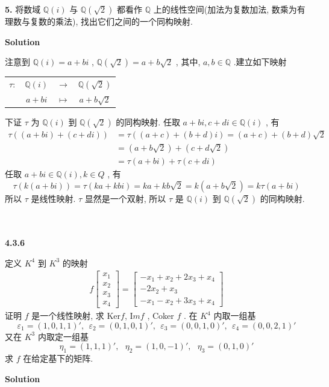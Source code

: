 \documentclass[11pt,a4paper,openany,oneside]{book}
\newcommand{\Image}{\mathrm Im}
\newcommand\Solution{\noindent\textbf{\textsf{Solution}}\par\medskip}
\begin{document}
\begin{myexample}
\textbf{5.} 将数域 $ \mathbb{Q}(i) $ 与 $ \mathbb{Q}(\sqrt{2}) $ 都看作 $ \mathbb{Q} $ 上的线性空间(加法为复数加法, 数乘为有理数与复数的乘法), 找出它们之间的一个同构映射. \\  

\end{myexample}
\Solution 

注意到 $ \mathbb{Q}(i) = a + bi $ ,  $ \mathbb{Q}(\sqrt{2}) = a + b\sqrt{2} $ , 其中, $ a, b \in \mathbb{Q} $ .建立如下映射
\begin{center}
	\begin{tabular}{cccc}
		 $ \tau :  $  &  $ \mathbb{Q}(i) $   &    $ \longrightarrow $   &   $ \mathbb{Q}(\sqrt{2}) $   \\
		&  $ a + bi $          &    $ \longmapsto $   &   $ a+b\sqrt{2} $  
	\end{tabular}
\end{center}
下证 $ \tau $ 为 $ \mathbb{Q}(i) $ 到 $ \mathbb{Q}(\sqrt{2}) $ 的同构映射. 任取 $ a+bi, c+di \in \mathbb{Q}(i) $ , 有
\begin{align*}
\tau ((a+bi) + (c+di)) &= \tau((a+c)+(b+d)i) = (a+c) + (b+d)\sqrt{2} \\
&= (a+b\sqrt{2}) + (c + d\sqrt{2}) \\
&= \tau(a+bi) + \tau(c+di)
\end{align*}
任取 $ a+bi \in \mathbb{Q}(i), k \in Q $ , 有
 $$  \tau(k(a+bi)) = \tau(ka+kbi) = ka + kb\sqrt{2} = k(a+b\sqrt{2}) = k\tau(a+bi)  $$ 
所以 $ \tau $ 是线性映射.  $ \tau $ 显然是一个双射, 所以 $ \tau $ 是 $ \mathbb{Q}(i) $ 到 $ \mathbb{Q}(\sqrt{2}) $ 的同构映射. \\  \\  \\ 





\begin{myexample}
	\textbf{4.3.6} 

定义 $ K^4 $ 到 $ K^3 $ 的映射
\begin{gather*}
f
\begin{bmatrix}
x_1 \\ x_2 \\ x_3 \\ x_4
\end{bmatrix}
=
\begin{bmatrix}
-x_1 + x_2 + 2x_3 + x_4 \\ 
-2x_2 + x_3 \\
-x_1 -x_2 + 3x_3 + x_4
\end{bmatrix}
\end{gather*}
证明 $ f $ 是一个线性映射, 求 $\mathrm{Ker}f$,  $ \Image f $ , Coker $ f $ . 在 $ K^4 $ 内取一组基
 $$  \varepsilon_1 = (1,0,1,1)', \ \ \varepsilon_2=(0,1,0,1)', \ \ \varepsilon_3=(0,0,1,0)', \ \ \varepsilon_4=(0,0,2,1)'  $$ 
又在 $ K^3 $ 内取定一组基
 $$  \eta_1 = (1,1,1)', \ \ \ \eta_2 = (1, 0, -1)', \ \ \ \eta_3=(0,1,0)'  $$ 
求 $ f $ 在给定基下的矩阵. \\ 

\end{myexample}
\Solution 
\end{document}
